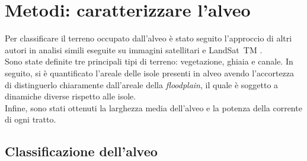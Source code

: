 \section{Metodi: caratterizzare l'alveo}
Per classificare il terreno occupato dall'alveo è stato seguito l'approccio di altri autori in analisi simili eseguite su immagini satellitari \AST{} e LandSat~TM .
\\
Sono state definite tre principali tipi di terreno: vegetazione, ghiaia e canale.
In seguito, si è quantificato l'areale delle isole presenti in alveo avendo l'accortezza di distinguerlo chiaramente dall'areale della \emph{floodplain}, il quale è soggetto a dinamiche diverse rispetto alle isole.
\\
Infine, sono stati ottenuti la larghezza media dell'alveo e la potenza della corrente di ogni tratto.

\subsection{Classificazione dell'alveo}
